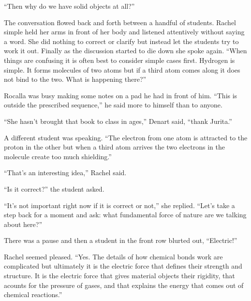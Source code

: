 ``Then why do we have solid objects at all?''

The conversation flowed back and forth between a handful of students. Rachel simple held her
arms in front of her body and listened attentively without saying a word. She did nothing to
correct or clarify but instead let the students try to work it out. Finally as the discussion
started to die down she spoke again. ``When things are confusing it is often best to consider
simple cases first. Hydrogen is simple. It forms molecules of two atoms but if a third atom
comes along it does not bind to the two. What is happening there?''

Rocalla was busy making some notes on a pad he had in front of him. ``This is outside the
prescribed sequence,'' he said more to himself than to anyone.

``She hasn't brought that book to class in ages,'' Denart said, ``thank Jurita.''

A different student was speaking. ``The electron from one atom is attracted to the proton in the
other but when a third atom arrives the two electrons in the molecule create too much
shielding.''

``That's an interesting idea,'' Rachel said.

``Is it correct?'' the student asked.

``It's not important right now if it is correct or not,'' she replied. ``Let's take a step back
for a moment and ask: what fundamental force of nature are we talking about here?''

There was a pause and then a student in the front row blurted out, ``Electric!''

Rachel seemed pleased. ``Yes. The details of how chemical bonds work are complicated but
ultimately it is the electric force that defines their strength and structure. It is the
electric force that gives material objects their rigidity, that acounts for the pressure of
gases, and that explains the energy that comes out of chemical reactions.''

